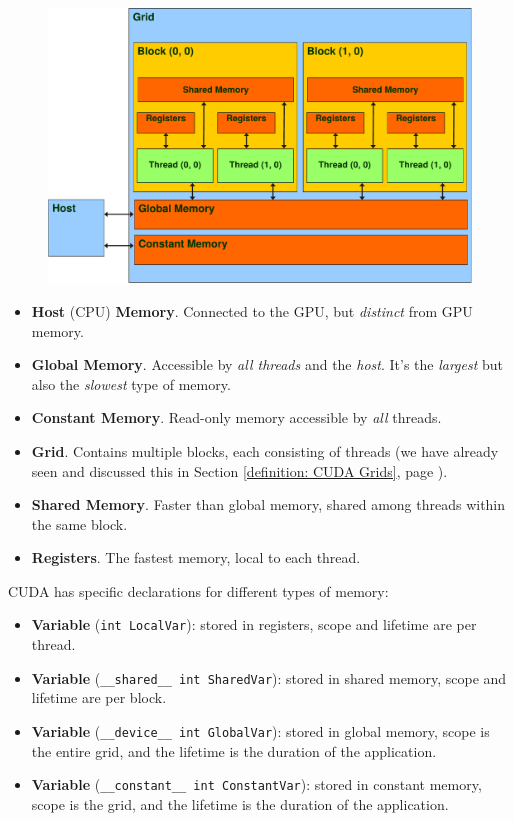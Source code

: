 \begin{figure}[!htp]
    \centering
    \includegraphics[width=\textwidth]{img/programmer-view-cuda-mem-1.pdf}
\end{figure}
\begin{itemize}
    \item \textbf{Host} (CPU) \textbf{Memory}. Connected to the GPU, but \emph{distinct} from GPU memory.
    \item \textbf{Global Memory}. Accessible by \emph{all threads} and the \emph{host}. It's the \emph{largest} but also the \emph{slowest} type of memory.
    \item \textbf{Constant Memory}. Read-only memory accessible by \emph{all} threads.
    \item \textbf{Grid}. Contains multiple blocks, each consisting of threads (we have already seen and discussed this in Section \ref{definition: CUDA Grids}, page \pageref{definition: CUDA Grids}).
    \item \textbf{Shared Memory}. Faster than global memory, shared among threads within the same block.
    \item \textbf{Registers}. The fastest memory, local to each thread.
\end{itemize}
CUDA has specific declarations for different types of memory:
\begin{itemize}
    \item {} \textbf{Variable} (\texttt{int LocalVar}): stored in registers, scope and lifetime are per thread.
    \item {} \textbf{Variable} (\texttt{\_\_shared\_\_ int SharedVar}): stored in shared memory, scope and lifetime are per block.
    \item {} \textbf{Variable} (\texttt{\_\_device\_\_ int GlobalVar}): stored in global memory, scope is the entire grid, and the lifetime is the duration of the application.
    \item {} \textbf{Variable} (\texttt{\_\_constant\_\_ int ConstantVar}): stored in constant memory, scope is the grid, and the lifetime is the duration of the application.
\end{itemize}
